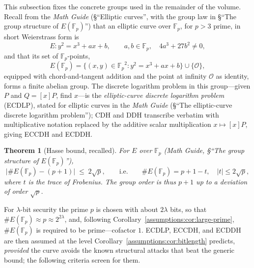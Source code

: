\documentclass[11pt,a4paper]{article}
\newtheorem{theorem}{Theorem}[section]
\theoremstyle{definition}
\theoremstyle{remark}
\newcommand{\Fp}{\ensuremath{\mathbb{F}_{p}}}
\providecommand{\abs}[1]{\lvert #1 \rvert}
\begin{document}
This subsection fixes the concrete groups used in the remainder of the
volume. Recall from the \emph{Math Guide} (\S``Elliptic curves'', with the
group law in \S``The group structure of \(E(\Fp)\)'') that an elliptic
curve over \(\Fp\), for \(p > 3\) prime, in short Weierstrass form is
\[
E \colon y^{2} = x^{3} + ax + b,
\qquad a, b \in \Fp, \quad 4a^{3} + 27b^{2} \ne 0,
\]
and that its set of \(\Fp\)-points,
\[
E(\Fp) = \bigl\{ (x, y) \in \Fp^{2} : y^{2} = x^{3} + ax + b \bigr\}
  \cup \{\mathcal O\},
\]
equipped with chord-and-tangent addition and the point at infinity
\(\mathcal O\) as identity, forms a finite abelian group. The discrete
logarithm problem in this group---given \(P\) and \(Q = [x]P\), find
\(x\)---is the \emph{elliptic-curve discrete logarithm problem}
(ECDLP), stated for elliptic curves in the \emph{Math Guide}
(\S``The elliptic-curve discrete logarithm problem''); CDH and DDH
transcribe verbatim with multiplicative notation replaced by the
additive scalar multiplication \(x \mapsto [x]P\), giving ECCDH and
ECDDH.

\begin{theorem}[Hasse bound, recalled]
\label{assumptions:thm:hasse}
For \(E\) over \(\Fp\) (\emph{Math Guide}, \S``The group structure of
\(E(\Fp)\)''),
\[
\bigl| \#E(\Fp) - (p + 1) \bigr| \;\le\; 2\sqrt p,
\qquad\text{i.e.}\qquad
\#E(\Fp) = p + 1 - t, \quad \abs{t} \le 2\sqrt p,
\]
where \(t\) is the \emph{trace of Frobenius}. The group order is thus
\(p + 1\) up to a deviation of order \(\sqrt p\).
\end{theorem}

For \(\lambda\)-bit security the prime \(p\) is chosen with about
\(2\lambda\) bits, so that \(\#E(\Fp) \approx p \approx 2^{2\lambda}\),
and, following Corollary~\ref{assumptions:cor:large-prime},
\(\#E(\Fp)\) is required to be prime---cofactor \(1\). ECDLP, ECCDH,
and ECDDH are then assumed at the level
Corollary~\ref{assumptions:cor:bitlength} predicts, \emph{provided} the
curve avoids the known structural attacks that beat the generic bound;
the following criteria screen for them.
\end{document}
